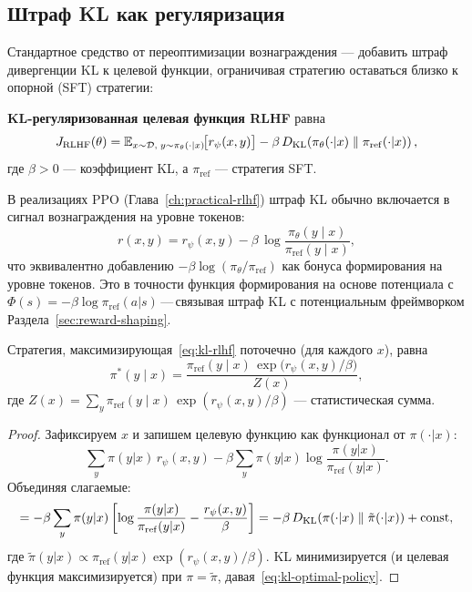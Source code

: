 \subsection{Штраф KL как регуляризация}

Стандартное средство от переоптимизации вознаграждения --- добавить штраф дивергенции KL к целевой функции, ограничивая стратегию оставаться близко к опорной (SFT) стратегии:

\begin{definition}
\label{def:kl-rlhf}
\textbf{KL-регуляризованная целевая функция RLHF} равна
\begin{equation}
\label{eq:kl-rlhf}
J_{\mathrm{RLHF}}(\theta)
= \operatorname{\mathbb{E}}_{x \sim \mathcal{D},\; y \sim \pi_\theta(\cdot|x)}\!\bigl[r_\psi(x, y)\bigr]
- \beta\,D_{\mathrm{KL}}\!\left(\pi_\theta(\cdot|x)\;\|\;\pi_{\mathrm{ref}}(\cdot|x)\right),
\end{equation}
где $\beta > 0$ --- коэффициент KL, а $\pi_{\mathrm{ref}}$ --- стратегия SFT.
\end{definition}

В реализациях PPO (Глава~\ref{ch:practical-rlhf}) штраф KL обычно включается в сигнал вознаграждения на уровне токенов:
\begin{equation}
\label{eq:kl-token-reward}
r(x, y) = r_\psi(x, y) - \beta\,\log\frac{\pi_\theta(y \mid x)}{\pi_{\mathrm{ref}}(y \mid x)},
\end{equation}
что эквивалентно добавлению $-\beta\log(\pi_\theta/\pi_{\mathrm{ref}})$ как бонуса формирования на уровне токенов. Это в точности функция формирования на основе потенциала с $\Phi(s) = -\beta\log\pi_{\mathrm{ref}}(a|s)$\,---\,связывая штраф KL с потенциальным фреймворком Раздела~\ref{sec:reward-shaping}.

\begin{theorem}
\label{thm:kl-optimal-policy}
Стратегия, максимизирующая~\eqref{eq:kl-rlhf} поточечно (для каждого $x$), равна
\begin{equation}
\label{eq:kl-optimal-policy}
\pi^*(y \mid x) = \frac{\pi_{\mathrm{ref}}(y \mid x)\,\exp\!\bigl(r_\psi(x, y)/\beta\bigr)}{Z(x)},
\end{equation}
где $Z(x) = \sum_y \pi_{\mathrm{ref}}(y \mid x)\,\exp(r_\psi(x, y)/\beta)$ --- статистическая сумма.
\end{theorem}

\begin{proof}
Зафиксируем $x$ и запишем целевую функцию как функционал от $\pi(\cdot|x)$:
\[
\sum_y \pi(y|x)\,r_\psi(x,y) - \beta\sum_y \pi(y|x)\log\frac{\pi(y|x)}{\pi_{\mathrm{ref}}(y|x)}.
\]
Объединяя слагаемые:
\[
= -\beta\sum_y \pi(y|x)\left[\log\frac{\pi(y|x)}{\pi_{\mathrm{ref}}(y|x)} - \frac{r_\psi(x,y)}{\beta}\right]
= -\beta\,D_{\mathrm{KL}}\!\left(\pi(\cdot|x)\;\|\;\tilde\pi(\cdot|x)\right) + \text{const},
\]
где $\tilde\pi(y|x) \propto \pi_{\mathrm{ref}}(y|x)\exp(r_\psi(x,y)/\beta)$. KL минимизируется (и целевая функция максимизируется) при $\pi = \tilde\pi$, давая~\eqref{eq:kl-optimal-policy}.
\end{proof}

